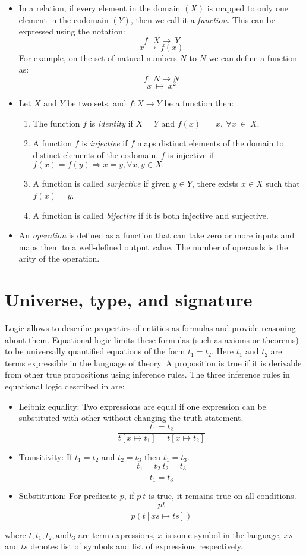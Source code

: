 \begin{itemize}
\item In a relation, if every element in the domain $(X)$ is mapped to only one
element in the codomain $(Y)$, then we call it a \emph{function}. This can be
expressed using the notation:
\[f:\ X \rightarrow\ Y\]
\[x \ \mapsto\ f(x)\]
For example, on the set of natural numbers $N$ to $N$ we can define a function as:
\[f:\ N \rightarrow N\]
\[x \ \mapsto\ x^{2}\]   
\item Let $ X $ and $ Y $ be two sets, and $ f:X \rightarrow Y$ be a function then:
\begin{enumerate}
    \item The function $f$ is \textit{identity} if $X=Y$ and $f(x)\ =\ x,\
    \forall x\ \in \ X$.
    \item A function $f$ is \emph{injective} if $f$ maps distinct elements of
    the domain to distinct elements of the codomain. $f$ is injective if
    $f(x)=f(y) \Rightarrow x = y, \forall x,y \in X.$
    \item A function is called \emph{surjective} if given $y \in Y$, there
    exists $x\in X$ such that $f(x) = y$.
    \item A function is called \emph{bijective} if it is both injective and
    surjective.
\end{enumerate}
\item An \emph{operation} is defined as a function that can take zero or more inputs
and maps them to a well-defined output value. The number of operands is the arity
of the operation.
\end{itemize}

\section{Universe, type, and signature}
Logic allows to describe properties of entities as formulas and provide
reasoning about them. Equational logic limits these formulas (such as axioms or
theorems) to  be universally quantified equations of the form $t_1 = t_2$. Here
$t_1$ and $t_2$ are terms expressible in the language of theory. A proposition
is true if it is derivable from other true propositions using inference rules.
The three inference rules in equational logic described in
\cite{gries2013logical} are:
\begin{itemize}
    \item Leibniz equality: Two expressions are equal if one expression can be
    substituted with other without changing the truth statement. \[\frac{t_1
    = t_2}{t[x \mapsto t_1] = t[x \mapsto t_2]}\]
    \item Transitivity: If $t_1 = t_2$ and $t_2 = t_3$ then $t_1 = t_3$.
    \[{\frac{t_1 = t_2\ t_2 = t_3}{t_1 = t_3}}\]
    \item Substitution: For predicate $p$, if $p\ t$ is true, it remains true on all
    conditions. \[\frac{p t}{p(t[xs \mapsto ts])}\]
\end{itemize}
where $t,t_1,t_2, \text{and} t_3$ are term expressions, $x$ is some symbol in the
language, $xs$ and $ts$ denotes list of symbols and list of expressions
respectively. 

